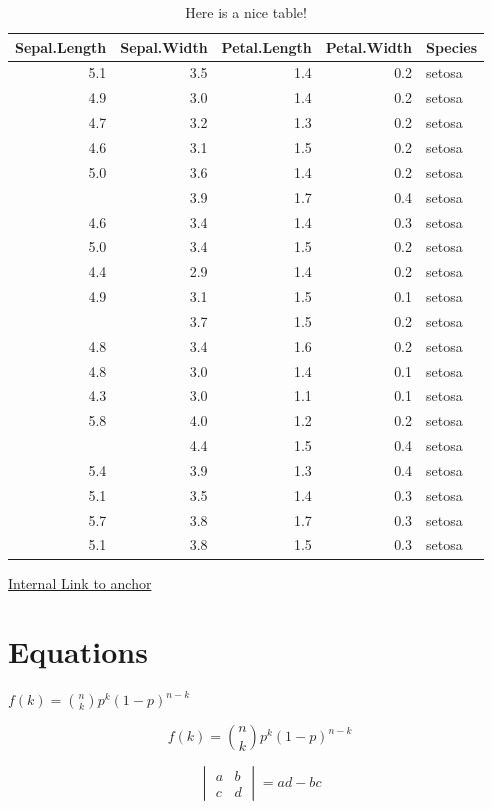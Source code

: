 \documentclass[
]{book}
\begin{document}
\begin{table}

\caption{\label{tab:nice-tab}Here is a nice table!}
\centering
\begin{tabular}[t]{rrrrl}
\toprule
Sepal.Length & Sepal.Width & Petal.Length & Petal.Width & Species\\
\midrule
5.1 & 3.5 & 1.4 & 0.2 & setosa\\
4.9 & 3.0 & 1.4 & 0.2 & setosa\\
4.7 & 3.2 & 1.3 & 0.2 & setosa\\
4.6 & 3.1 & 1.5 & 0.2 & setosa\\
5.0 & 3.6 & 1.4 & 0.2 & setosa\\
\addlinespace
5.4 & 3.9 & 1.7 & 0.4 & setosa\\
4.6 & 3.4 & 1.4 & 0.3 & setosa\\
5.0 & 3.4 & 1.5 & 0.2 & setosa\\
4.4 & 2.9 & 1.4 & 0.2 & setosa\\
4.9 & 3.1 & 1.5 & 0.1 & setosa\\
\addlinespace
5.4 & 3.7 & 1.5 & 0.2 & setosa\\
4.8 & 3.4 & 1.6 & 0.2 & setosa\\
4.8 & 3.0 & 1.4 & 0.1 & setosa\\
4.3 & 3.0 & 1.1 & 0.1 & setosa\\
5.8 & 4.0 & 1.2 & 0.2 & setosa\\
\addlinespace
5.7 & 4.4 & 1.5 & 0.4 & setosa\\
5.4 & 3.9 & 1.3 & 0.4 & setosa\\
5.1 & 3.5 & 1.4 & 0.3 & setosa\\
5.7 & 3.8 & 1.7 & 0.3 & setosa\\
5.1 & 3.8 & 1.5 & 0.3 & setosa\\
\bottomrule
\end{tabular}
\end{table}

\protect\hyperlink{abcd}{Internal Link to anchor}

\hypertarget{equations}{%
\section*{Equations}\label{equations}}

\(f(k) = {n \choose k} p^{k} (1-p)^{n-k}\)

\[f(k) = {n \choose k} p^{k} (1-p)^{n-k}\]

\[\begin{vmatrix}a & b\\
c & d
\end{vmatrix}=ad-bc\]
\end{document}
